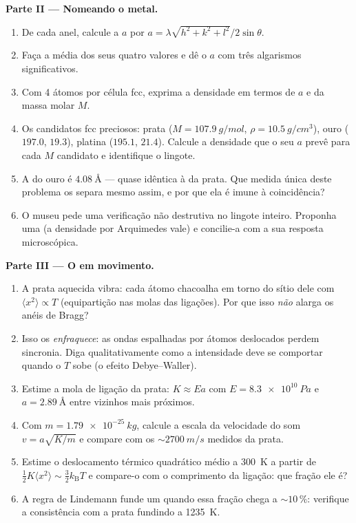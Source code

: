 \begin{problem}
\medskip\noindent\textbf{Parte II --- Nomeando o metal.}

\begin{enumerate}[resume]
  \item De cada anel, calcule a  $a$ por
        $a = \lambda\sqrt{h^2+k^2+l^2}/2\sin\theta$.
  \item Faça a média dos seus quatro valores e dê o $a$ com três
        algarismos significativos.
  \item Com 4 átomos por célula fcc, exprima a densidade em termos
        de $a$ e da massa molar $M$.
  \item Os candidatos fcc preciosos: prata
        ($M = \qty{107.9}{g/mol}$, $\rho = \qty{10.5}{g/cm^3}$),
        ouro ($197.0$, $19.3$), platina ($195.1$, $21.4$).
        Calcule a densidade que o seu $a$ prevê para cada $M$
        candidato e identifique o lingote.
  \item A  do ouro é $\qty{4.08}{\angstrom}$ ---
        quase idêntica à da prata. Que medida única deste
        problema os separa mesmo assim, e por que ela é imune
        à coincidência?
  \item O museu pede uma verificação não destrutiva no lingote
        inteiro. Proponha uma (a densidade por Arquimedes vale) e
        concilie-a com a sua resposta microscópica.
\end{enumerate}

\medskip\noindent\textbf{Parte III --- O  em movimento.}

\begin{enumerate}[resume]
  \item A prata aquecida vibra: cada átomo chacoalha em torno do sítio
        dele com $\langle x^2\rangle \propto T$ (equipartição nas
        molas das ligações). Por que isso \emph{não} alarga os anéis
        de Bragg?
  \item Isso os \emph{enfraquece}: as ondas espalhadas por átomos
        deslocados perdem sincronia. Diga qualitativamente como a
        intensidade deve se comportar quando o $T$ sobe (o efeito
        Debye--Waller).
  \item Estime a mola de ligação da prata: $K \approx Ea$ com
        $E = \qty{8.3e10}{Pa}$ e $a = \qty{2.89}{\angstrom}$
        entre vizinhos mais próximos.
  \item Com $m = \qty{1.79e-25}{kg}$, calcule a escala da velocidade
        do som $v = a\sqrt{K/m}$ e compare com os
        $\sim\qty{2700}{m/s}$ medidos da prata.
  \item Estime o deslocamento térmico quadrático médio a \qty{300}{K}
        a partir de $\tfrac12K\langle x^2\rangle \sim
        \tfrac32k_{\text{B}}T$ e compare-o com o comprimento da
        ligação: que fração ele é?
  \item A regra de Lindemann funde um  quando essa fração
        chega a $\sim10\,\%$: verifique a consistência com a prata
        fundindo a \qty{1235}{K}.
\end{enumerate}


\end{problem}
